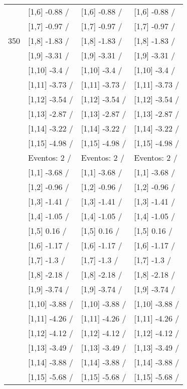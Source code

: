 \begin{table}
\begin{tabular}[t]{llll}
 & {}[1,6] -0.88  / & {}[1,6] -0.88  / & {}[1,6] -0.88  /\\
 & {}[1,7] -0.97  / & {}[1,7] -0.97  / & {}[1,7] -0.97  /\\
350 & {}[1,8] -1.83  / & {}[1,8] -1.83  / & {}[1,8] -1.83  /\\
\addlinespace
 & {}[1,9] -3.31  / & {}[1,9] -3.31  / & {}[1,9] -3.31  /\\
 & {}[1,10] -3.4  / & {}[1,10] -3.4  / & {}[1,10] -3.4  /\\
 & {}[1,11] -3.73  / & {}[1,11] -3.73  / & {}[1,11] -3.73  /\\
 & {}[1,12] -3.54  / & {}[1,12] -3.54  / & {}[1,12] -3.54  /\\
 & {}[1,13] -2.87  / & {}[1,13] -2.87  / & {}[1,13] -2.87  /\\
\addlinespace
 & {}[1,14] -3.22  / & {}[1,14] -3.22  / & {}[1,14] -3.22  /\\
 & {}[1,15] -4.98  / & {}[1,15] -4.98  / & {}[1,15] -4.98  /\\
 & Eventos:  2 / & Eventos:  2 / & Eventos:  2 /\\
 & {}[1,1] -3.68  / & {}[1,1] -3.68  / & {}[1,1] -3.68  /\\
 & {}[1,2] -0.96  / & {}[1,2] -0.96  / & {}[1,2] -0.96  /\\
\addlinespace
 & {}[1,3] -1.41  / & {}[1,3] -1.41  / & {}[1,3] -1.41  /\\
 & {}[1,4] -1.05  / & {}[1,4] -1.05  / & {}[1,4] -1.05  /\\
 & {}[1,5] 0.16  / & {}[1,5] 0.16  / & {}[1,5] 0.16  /\\
 & {}[1,6] -1.17  / & {}[1,6] -1.17  / & {}[1,6] -1.17  /\\
 & {}[1,7] -1.3  / & {}[1,7] -1.3  / & {}[1,7] -1.3  /\\
\addlinespace
500 & {}[1,8] -2.18  / & {}[1,8] -2.18  / & {}[1,8] -2.18  /\\
 & {}[1,9] -3.74  / & {}[1,9] -3.74  / & {}[1,9] -3.74  /\\
 & {}[1,10] -3.88  / & {}[1,10] -3.88  / & {}[1,10] -3.88  /\\
 & {}[1,11] -4.26  / & {}[1,11] -4.26  / & {}[1,11] -4.26  /\\
 & {}[1,12] -4.12  / & {}[1,12] -4.12  / & {}[1,12] -4.12  /\\
\addlinespace
 & {}[1,13] -3.49  / & {}[1,13] -3.49  / & {}[1,13] -3.49  /\\
 & {}[1,14] -3.88  / & {}[1,14] -3.88  / & {}[1,14] -3.88  /\\
 & {}[1,15] -5.68  / & {}[1,15] -5.68  / & {}[1,15] -5.68  /\\
\bottomrule
\end{tabular}
\end{table}
